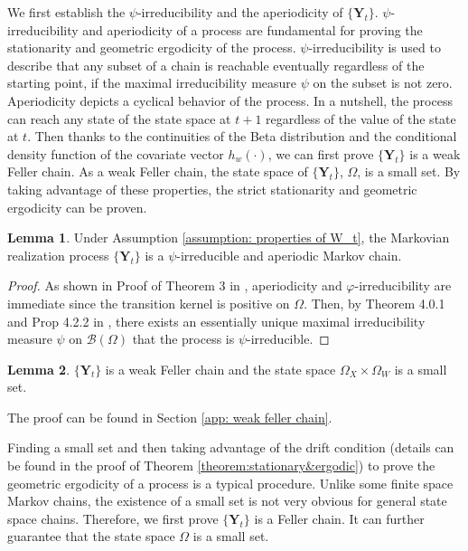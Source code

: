 \documentclass{article}
\theoremstyle{definition}
\newtheorem{lemma}{Lemma}[section]
\begin{document}
We first establish the $\psi$-irreducibility and the aperiodicity of $\{\bm{Y}_{t}\}$. $\psi$-irreducibility and aperiodicity of a process are fundamental for proving the stationarity and geometric ergodicity of the process. $\psi$-irreducibility is used to describe that any subset of a chain is reachable eventually regardless of the starting point, if the maximal irreducibility measure $\psi$ on the subset is not zero. Aperiodicity depicts a cyclical behavior of the process. In a nutshell, the process can reach any state of the state space at $t+1$ regardless of the value of the state at $t$. Then thanks to the continuities of the Beta distribution and the conditional density function of the covariate vector $h_w(\cdot)$, we can first prove $\{\bm{Y}_t\}$ is a weak Feller chain. As a weak Feller chain, the state space of $\{\bm{Y}_t\}$, $\Omega$, is a small set. By taking advantage of these properties, the strict stationarity and geometric ergodicity can be proven. 
\begin{lemma}
\label{lemma:irreducibility&aperiodicity}
Under Assumption \ref{assumption: properties of W_t}, the Markovian realization process $\{\bm{Y}_t\}$ is a $\psi$-irreducible and aperiodic Markov chain. 
\end{lemma}
\begin{proof}
As shown in Proof of Theorem 3 in \cite{woodard2010stationarity}, aperiodicity and $\varphi$-irreducibility are immediate since the transition kernel is positive on $\Omega$. Then, by Theorem 4.0.1 and Prop 4.2.2 in \cite{meyn1993markov}, there exists an essentially unique maximal irreducibility measure $\psi$ on $\mathcal{B}(\Omega)$ that the process is $\psi$-irreducible.
\end{proof}
\begin{lemma}
\label{lemma:weak Feller}
$\{\bm{Y}_t\}$ is a weak Feller chain and the state space $\Omega_X \times \Omega_W$ is a small set. 
\end{lemma}
The proof can be found in Section \ref{app: weak feller chain}. 

Finding a small set and then taking advantage of the drift condition (details can be found in the proof of Theorem \ref{theorem:stationary&ergodic}) to prove the geometric ergodicity of a process is a typical procedure. Unlike some finite space Markov chains, the existence of a small set is not very obvious for general state space chains. Therefore, we first prove $\{\bm{Y}_t\}$ is a Feller chain. It can further guarantee that the state space $\Omega$ is a small set. 
\end{document}
